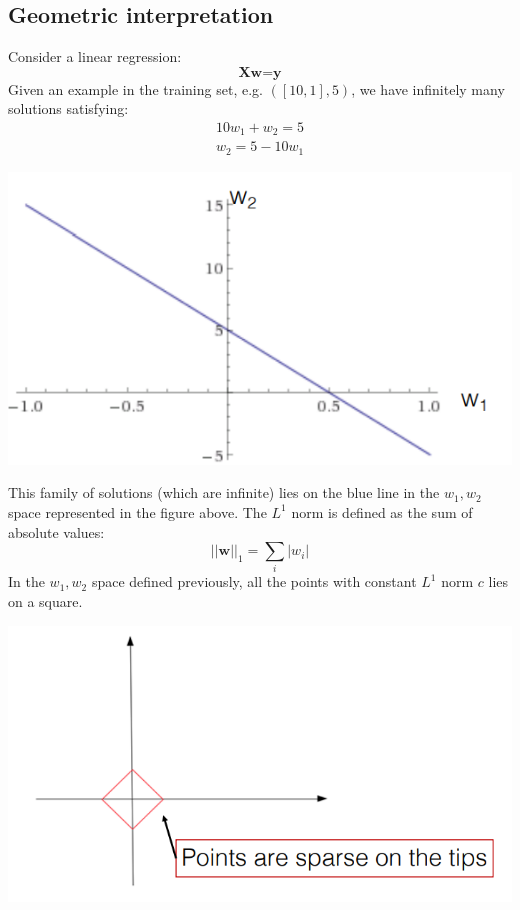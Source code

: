 \subsection{Geometric interpretation}
Consider a linear regression:
\[\textbf{Xw} = \textbf{y}\]
Given an example in the training set, e.g. $([10, 1], 5)$, we have infinitely many solutions satisfying:
\[\begin{split}
    10 w_1 + w_2 = 5 \\
    w_2 = 5 - 10 w_1
\end{split}\]
\begin{center}
    \includegraphics[scale=0.7]{images/geometric l1.png}
\end{center}
This family of solutions (which are infinite) lies on the blue line in the $w_1, w_2$ space represented in the figure above.\newline\newline
The $L^1$ norm is defined as the sum of absolute values:
\[||\textbf{w}||_1 = \sum_i |w_i|\]
In the $w_1, w_2$ space defined previously, all the points with constant $L^1$ norm $c$ lies on a square.
\begin{center}
    \includegraphics[scale=0.7]{images/l1 reg..png}
\end{center}
